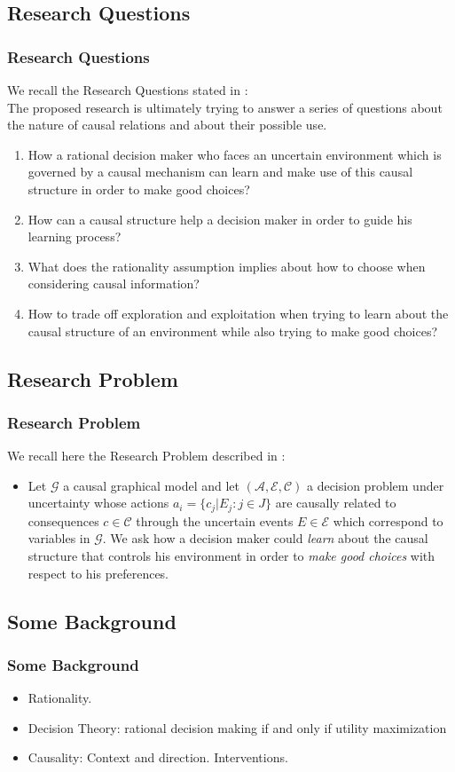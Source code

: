 \documentclass{beamer}
\theoremstyle{plain}
\begin{document}
\subsection{Research Questions}
\begin{frame}
\frametitle{Research Questions}
We recall the Research Questions stated in \cite{gonzalez2019causal}:\\
The proposed research is ultimately trying to answer a series of questions about the nature of causal relations and about their possible use.
\begin{enumerate}
\item How a rational decision maker who faces an uncertain environment which is governed by a causal mechanism can learn and make use of this causal structure in order to make good choices? \item How can a causal structure help a decision maker in order to guide his learning process? 
\item What does the rationality assumption implies about how to choose when considering causal information? 
\item How to trade off exploration and exploitation when trying to learn about the causal structure of an environment while also trying to make good choices?
\end{enumerate}
\end{frame}

\subsection{Research Problem}
\begin{frame}
\frametitle{Research Problem}
We recall here the Research Problem described in \cite{gonzalez2019causal}:
\begin{itemize}
\item Let  $\mathcal{G}$ a causal graphical model and let $(\mathcal{A},\mathcal{E},\mathcal{C})$ a decision problem under uncertainty whose actions $a_i = \{ c_j | E_j : j \in J \}$  are causally related to consequences $c \in \mathcal{C}$ through the uncertain events $E \in \mathcal{E}$ which correspond to variables in $\mathcal{G}$. We ask how a decision maker could \textit{learn} about the causal structure that controls his environment in order to \textit{make good choices} with respect to his preferences.
\end{itemize}
\end{frame}

\subsection{Some Background}
\begin{frame}
\frametitle{Some Background}
\begin{itemize}
\item Rationality.
\item Decision Theory: rational decision making if and only if utility maximization
\item Causality: Context and direction. Interventions. 
\end{itemize}
\end{frame}
\end{document}

